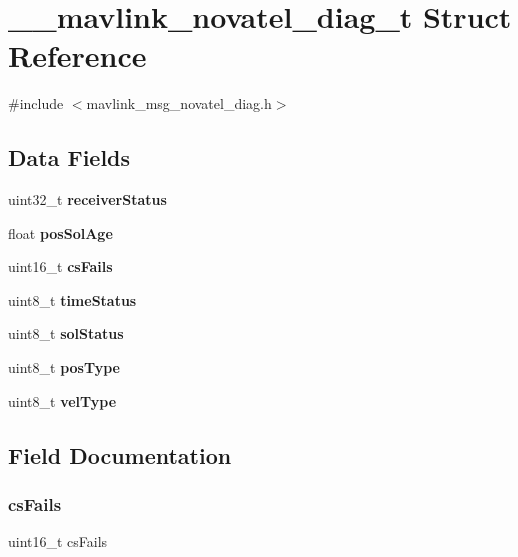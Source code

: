 \section{\+\_\+\+\_\+mavlink\+\_\+novatel\+\_\+diag\+\_\+t Struct Reference}
\label{struct____mavlink__novatel__diag__t}


{\ttfamily \#include $<$mavlink\+\_\+msg\+\_\+novatel\+\_\+diag.\+h$>$}

\subsection*{Data Fields}
\begin{DoxyCompactItemize}
\item 
uint32\+\_\+t \textbf{ receiver\+Status}
\item 
float \textbf{ pos\+Sol\+Age}
\item 
uint16\+\_\+t \textbf{ cs\+Fails}
\item 
uint8\+\_\+t \textbf{ time\+Status}
\item 
uint8\+\_\+t \textbf{ sol\+Status}
\item 
uint8\+\_\+t \textbf{ pos\+Type}
\item 
uint8\+\_\+t \textbf{ vel\+Type}
\end{DoxyCompactItemize}


\subsection{Field Documentation}
\mbox{\label{struct____mavlink__novatel__diag__t_a119a14610506f99a3e57fe06aaea19f1}} 
\subsubsection{cs\+Fails}
{\footnotesize\ttfamily uint16\+\_\+t cs\+Fails}

\mbox{\label{struct____mavlink__novatel__diag__t_adf0fd27ed18a326474e1cf29bce9d5a5}} 
